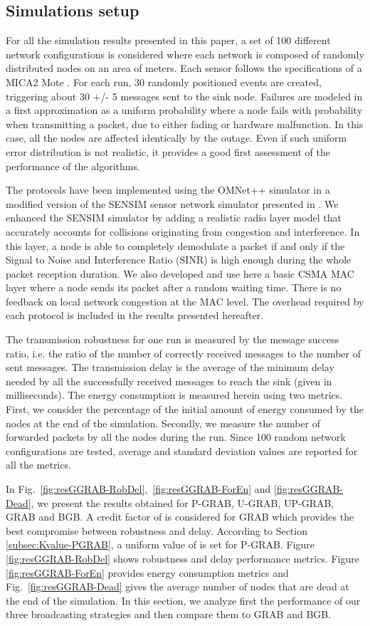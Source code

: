 \documentclass[journal, peerreview, onecolumn, draftcls]{IEEEtran}
\begin{document}
\subsection{Simulations setup}\label{subsec:simSetup}
For all the simulation results presented in this paper, a set of 100 different network configurations is considered where each network is composed of  randomly distributed nodes on an area of  meters.
Each sensor follows the specifications of a MICA2 Mote \cite{Mica2}. For each run, 30 randomly positioned events are created, triggering about 30 +/- 5 messages sent to the sink node.
Failures are modeled in a first approximation as a uniform probability where a node fails with probability  when transmitting a packet, due to either fading or hardware malfunction. In this case, all the nodes are affected identically by the outage. Even if such uniform error distribution is not realistic, it provides a good first assessment of the performance of the algorithms.

The protocols have been implemented using the OMNet++ simulator in a modified version of the SENSIM sensor network simulator presented in \cite{LSUsimulator}. We enhanced the SENSIM simulator by adding a realistic radio layer model that accurately accounts for collisions originating from congestion and interference. In this layer, a node is able to completely demodulate a packet if and only if the Signal to Noise and Interference Ratio (SINR) is high enough during the whole packet reception duration. We also developed and use here a basic CSMA MAC layer where a node sends its packet after a random waiting time. There is no feedback on local network congestion at the MAC level. The overhead required by each protocol is included in the results presented hereafter.

The transmission robustness for one run is measured by the message success ratio, i.e. the ratio of the number of correctly received messages to the number of sent messages. The transmission delay is the average of the minimum delay needed by all the successfully received messages to reach the sink (given in milliseconds). The energy consumption is measured herein using two metrics. First, we consider the percentage of the initial amount of energy consumed by the nodes at the end of the simulation. Secondly, we measure the number of forwarded packets by all the nodes during the run. Since 100 random network configurations are tested, average and standard deviation values are reported for all the metrics.

In Fig.~\ref{fig:resGGRAB-RobDel},~\ref{fig:resGGRAB-ForEn} and \ref{fig:resGGRAB-Dead}, we present the results obtained for P-GRAB, U-GRAB, UP-GRAB, GRAB and BGB. A credit factor of  is considered for GRAB which provides the best compromise between robustness and delay.
According to Section \ref{subsec:Kvalue-PGRAB}, a uniform value of  is set for P-GRAB. Figure \ref{fig:resGGRAB-RobDel} shows robustness and delay performance metrics. Figure \ref{fig:resGGRAB-ForEn} provides energy consumption metrics and Fig.~\ref{fig:resGGRAB-Dead} gives the average number of nodes that are dead at the end of the simulation.
In this section, we analyze first the performance of our three broadcasting strategies and then compare them to GRAB and BGB.
\end{document}
